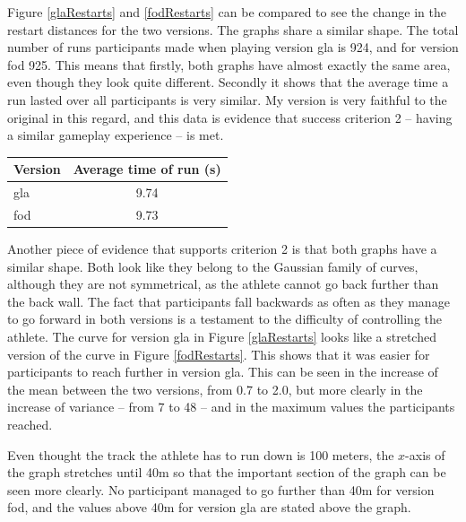 \documentclass[12pt,a4paper,twoside,openright]{report}
\begin{document}
Figure \ref{glaRestarts} and \ref{fodRestarts} can be compared to see the change in the restart distances for the two versions. The graphs share a similar shape.
The total number of runs participants made when playing version gla is 924, and for version fod 925. This means that firstly, both graphs have almost exactly the same area, even though they look quite different. Secondly it shows that the average time a run lasted over all participants is very similar. My version is very faithful to the original in this regard, and this data is evidence that success criterion 2 -- having a similar gameplay experience -- is met.

\begin{center}\begin{tabular}{ |p{3cm}|c| }\hline
Version& Average time of run (s)\\ \hline
gla & 9.74 \\ \hline
fod & 9.73 \\ \hline
\end{tabular}\end{center}

Another piece of evidence that supports criterion 2 is that both graphs have a similar shape. Both look like they belong to the Gaussian family of curves, although they are not symmetrical, as the athlete cannot go back further than the back wall.
The fact that participants fall backwards as often as they manage to go forward in both versions is a testament to the difficulty of controlling the athlete.
The curve for version gla in Figure \ref{glaRestarts} looks like a stretched version of the curve in Figure \ref{fodRestarts}. This shows that it was easier for participants to reach further in version gla.
This can be seen in the increase of the mean between the two versions, from 0.7 to 2.0, but more clearly in the increase of variance -- from 7 to 48 -- and in the maximum values the participants reached.

Even thought the track the athlete has to run down is 100 meters, the $x$-axis of the graph stretches until 40m so that the important section of the graph can be seen more clearly. No participant managed to go further than 40m for version fod, and the values above 40m for version gla are stated above the graph.

\end{document}
